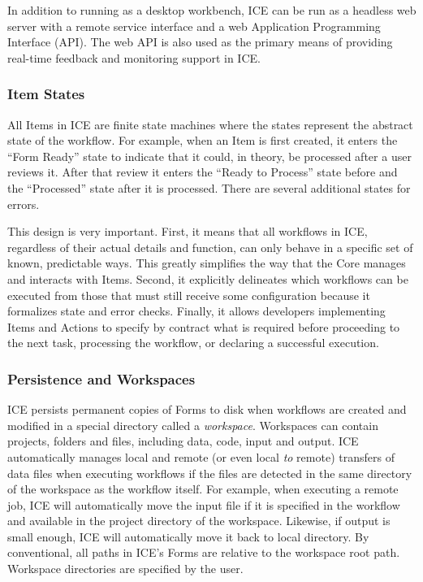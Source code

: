 In addition to running as a desktop workbench, ICE can be run as a
headless web server with a remote service interface and a web
Application Programming Interface (API). The web API is also used as the
primary means of providing real-time feedback and monitoring support in
ICE.

\subsubsection{Item States}\label{item-states}

All Items in ICE are finite state machines where the states represent
the abstract state of the workflow. For example, when an Item is first
created, it enters the ``Form Ready'' state to indicate that it could,
in theory, be processed after a user reviews it. After that review it
enters the ``Ready to Process'' state before and the ``Processed'' state
after it is processed. There are several additional states for errors.

This design is very important. First, it means that all workflows in
ICE, regardless of their actual details and function, can only behave in
a specific set of known, predictable ways. This greatly simplifies the
way that the Core manages and interacts with Items. Second, it
explicitly delineates which workflows can be executed from those that
must still receive some configuration because it formalizes state and
error checks. Finally, it allows developers implementing Items and
Actions to specify by contract what is required before proceeding to the
next task, processing the workflow, or declaring a successful execution.

\subsubsection{Persistence and
Workspaces}\label{persistence-and-workspaces}

ICE persists permanent copies of Forms to disk when workflows are
created and modified in a special directory called a \emph{workspace}.
Workspaces can contain projects, folders and files, including data,
code, input and output. ICE automatically manages local and remote (or
even local \emph{to} remote) transfers of data files when executing
workflows if the files are detected in the same directory of the
workspace as the workflow itself. For example, when executing a remote
job, ICE will automatically move the input file if it is specified in
the workflow and available in the project directory of the workspace.
Likewise, if output is small enough, ICE will automatically move it back
to local directory. By conventional, all paths in ICE's Forms are
relative to the workspace root path. Workspace directories are specified
by the user.


